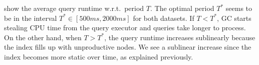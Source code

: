 \documentclass[abstracton,12pt]{scrartcl}
\theoremstyle{definition}
\begin{document}


\vspace{-0.2cm}

show the average query runtime w.r.t.\ period $T$.
The optimal period $T^*$ seems to be in the interval $T^* \in [500ms,2000ms]$ for
both datasets. If $T < T^*$, GC starts stealing CPU time
from the query executor and queries take longer to process.
On the other hand, when $T > T^*$, the query runtime increases sublinearly because
the index fills up with unproductive nodes. We see a sublinear increase since
the index becomes more static over time, as explained previously.
\end{document}
